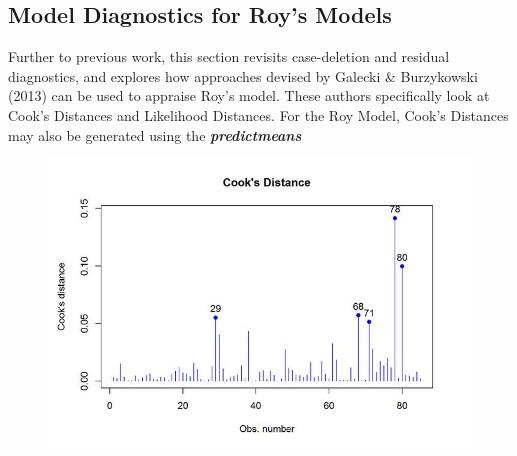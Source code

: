 \documentclass[12pt, a4paper]{report}
\theoremstyle{plain}
\theoremstyle{definition}
\theoremstyle{remark}
\begin{document}
	
	
	
	

	



	\subsection{Model Diagnostics for Roy's Models}
	
	
	Further to previous work, this section revisits case-deletion and residual diagnostics, and explores how approaches devised by  Galecki \& Burzykowski (2013) can be used to appraise Roy's model. These authors specifically look at Cook's Distances and Likelihood Distances.
	For the Roy Model, Cook's Distances may also be generated using the \textbf{\textit{predictmeans}}
	
	
	
	\begin{figure}[h!]
		\centering
		\includegraphics[width=0.7\linewidth]{images/CooksDistancePlot-JS-Roy}
		\caption{}
		\label{fig:CooksDistancePlot-JS-Roy}
	\end{figure}
\end{document}
